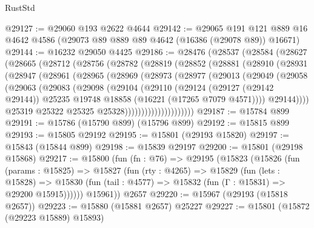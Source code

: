 \begin{lexlean}{RustStd}
\begin{coremodule}
@29127 := @29060 @193 @2622 @4644
@29142 := @29065
    @191
    @121
    @889
    @16
    @4642
    @4586
    (@29073 @89 @889 @89 @4642 (@16386 (@29078 @89)) @16671)
@29144 := @16232 @29050 @4425
@29186 := @28476
    (@28537
      (@28584
        (@28627
          (@28665
            (@28712
              (@28756
                (@28782
                  (@28819
                    (@28852
                      (@28881
                        (@28910
                          (@28931
                            (@28947
                              (@28961
                                (@28965
                                  (@28969
                                    (@28973
                                      (@28977
                                        (@29013
                                          (@29049
                                            (@29058
                                              (@29063
                                                (@29083
                                                  (@29098
                                                    (@29104
                                                      (@29110
                                                        (@29124
                                                          (@29127 (@29142 @29144))
                                                          @25235
                                                          @19748
                                                          @18858
                                                          (@16221 (@17265 @7079 @4571))))
                                                      @29144))))
                                              @25319
                                              @25322
                                              @25325
                                              @25328)))))))))))))))))))))
@29187 := @15784 @899
@29191 := @15786 (@15790 @899) (@15796 @899)
@29192 := @15815 @899
@29193 := @15805 @29192
@29195 := @15801 (@29193 @15820)
@29197 := @15843 (@15844 @899)
@29198 := @15839 @29197
@29200 := @15801 (@29198 @15868)
@29217 := @15800
    (fun (fn : @76) =>
    @29195
      (@15823
        (@15826
          (fun (params : @15825) =>
          @15827
            (fun (rty : @4265) =>
            @15829
              (fun (lets : @15828) =>
              @15830 (fun (tail : @4577) => @15832 (fun (Γ : @15831) => @29200 @15915))))))
        @15961))
    @2657
@29220 := @15967 (@29193 (@15818 @2657))
@29223 := @15880 (@15881 @2657) @25227
@29227 := @15801 (@15872 (@29223 @15889) @15893)

\end{coremodule}
\end{lexlean}

